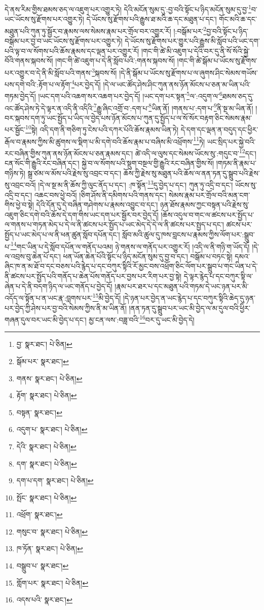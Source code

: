 དེ་ནས་རིམ་གྱིས་ཐམས་ཅད་ལ་འཇུག་པར་འགྱུར་ཏེ། དེའི་མངོན་སུམ་དུ་:བྱ་བའི་སྟོང་པ་ཉིད་མངོན་སུམ་དུ་བྱ་\footnote{བྱ་  སྣར་ཐང་།  པེ་ཅིན། }བ་ཡང་ཡོངས་སུ་རྫོགས་པར་འགྱུར་ཏེ། དེ་ཡོངས་སུ་རྫོགས་པའི་རྒྱུས་ཐ་མའི་ཆ་དང་མཐུན་པ་དང་། གོང་མའི་ཆ་དང་མཐུན་པའི་ཀུན་ཏུ་སྦྱོར་བ་རྣམས་ལས་སེམས་རྣམ་པར་གྲོལ་བར་འགྱུར་རོ། །:བསྒོམ་པར་\footnote{སྒོམ་པར་  སྣར་ཐང་། }བྱ་བའི་སྟོང་པ་ཉིད་བསྒོམ་པར་བྱ་བ་ཡང་ཡོངས་སུ་རྫོགས་པར་འགྱུར་ཏེ། དེ་ཡོངས་སུ་རྫོགས་པར་གྱུར་པའི་རྒྱུས་མི་སློབ་པའི་ཡང་དག་པའི་ལྟ་བ་ལ་སོགས་པའི་ཆོས་རྣམས་དང་ལྡན་པར་འགྱུར་རོ། །གང་གི་ཚེ་མི་འཇུག་པ་དེའི་བར་དུ་ནི་སོ་སོའི་སྐྱེ་བོའི་གནས་སྐབས་སོ། །གང་གི་ཚེ་འཇུག་པ་དེ་ནི་སློབ་པའི་:གནས་སྐབས་སོ། །གང་གི་ཚེ་སྒོམ་པ་ཡོངས་སུ་རྫོགས་པར་འགྱུར་བ་དེ་ནི་མི་སློབ་པའི་གནས་\footnote{གནས་  སྣར་ཐང་།  པེ་ཅིན། }སྐབས་སོ། །དེ་ནི་སྒོམ་པ་ཡོངས་སུ་རྫོགས་པ་ལ་ཞུགས་ཤིང་སེམས་གཡོས་པས་དགེ་བའི་:རྟོག་པ་ལ་རྟོག་\footnote{རྟོག་  སྣར་ཐང་།  པེ་ཅིན། }པར་བྱེད་དོ། །དེ་ལ་ཡང་ཚོད་ཤེས་ཤིང་ཀུན་ནས་ཉོན་མོངས་པ་ཅན་མ་ཡིན་པའི་གཏམ་བྱེད་དོ། །ཡང་དག་པའི་འཆག་སར་འཆག་པར་བྱེད་དོ། །ཡང་དག་པར་སྟན་\footnote{བསྟན་  སྣར་ཐང་། }ལ་:འདུག་ལ་\footnote{འདུག་པ་  སྣར་ཐང་།  པེ་ཅིན། }ཐམས་ཅད་དུ་འང་ཚོད་ཤེས་ཏེ་དེ་ལྟར་ན་འདི་ནི་འདིའི་\footnote{དེའི་  སྣར་ཐང་།  པེ་ཅིན། }རྒྱུ་ཞིང་འགྲོ་བ་:དག་པ་\footnote{དག་  སྣར་ཐང་།  པེ་ཅིན། }ཡིན་ནོ། །གནས་པ་:དག་པ་\footnote{དག་པ་དག་  སྣར་ཐང་།  པེ་ཅིན། }ནི་སྔ་མ་ཡིན་ནོ། །བར་སྐབས་དག་ཏུ་ཡང་སྤྱོད་པ་ཡིད་ལ་བྱེད་པས་ཉོན་མོངས་པ་ཀུན་དུ་སྤྱོད་པ་ལ་སོ་སོར་བརྟག་ཅིང་སེམས་རྣམ་པར་སྦྱོང་\footnote{སྤོང་  སྣར་ཐང་།  པེ་ཅིན། }སྟེ། འདི་དག་ནི་གཅིག་ཏུ་ངེས་པའི་དཀར་པོའི་ཆོས་རྣམས་ཡིན་ཏེ། དེ་དག་དང་ལྡན་ན་བདུད་དང་ཕྱིར་རྒོལ་བ་རྣམས་ཀྱིས་མི་ཚུགས་ལ་སྡིག་པ་མི་དགེ་བའི་ཆོས་རྣམ་པ་བཞིས་མི་འཕྲོགས་\footnote{འཕྲོག་  སྣར་ཐང་། }ཏེ། ཡང་སྲིད་པར་སྐྱེ་བའི་རང་བཞིན་གྱིས་ཀུན་ནས་ཉོན་མོངས་པ་ཅན་རྣམས་དང་། ཚེ་འདི་ལ་ལུས་དང་སེམས་ཡོངས་སུ་:གདུང་བ་\footnote{གསུང་བ་  སྣར་ཐང་།  པེ་ཅིན། }དང་། ངན་སོང་གི་རྒྱུའི་རང་བཞིན་དང་། སྐྱེ་བ་ལ་སོགས་པའི་སྡུག་བསྔལ་གྱི་རྒྱུའི་རང་བཞིན་གྱིས་སོ། །གཏམ་ནི་རྣམ་པ་གཉིས་ཏེ། སྒྲ་ཙམ་ལ་མོས་པའི་རྗེས་སུ་འབྲང་བ་དང་། ཆོས་ཀྱི་རྗེས་སུ་མཐུན་པའི་ཆོས་ལ་ནན་ཏན་དུ་སྒྲུབ་པའི་རྗེས་སུ་འབྲང་བའོ། །དེ་ལ་སྔ་མ་ནི་ཆོས་ཀྱི་ལུང་ནོད་པ་དང་། :ཁ་སྟོན་\footnote{ཁ་ཏོན་  སྣར་ཐང་།  པེ་ཅིན། }དུ་བྱེད་པ་དང་། ཀུན་ཏུ་འདྲི་བ་དང་། ཡོངས་སུ་འདྲི་བ་དང་། འཆང་བས་ཕྱེ་བའོ། །ཅིག་ཤོས་ནི་དམིགས་པའི་གནས་དང་། སེམས་རྣམ་པར་གྲོལ་བའི་མན་ངག་གིས་ཕྱེ་བ་སྟེ། དེའི་དོན་དུ་དེ་བཞིན་གཤེགས་པ་རྣམས་འབྱུང་བ་དང་། ཉན་ཐོས་རྣམས་ཀྱང་བསྟན་པའི་རྗེས་སུ་འཇུག་ཅིང་དགེ་བའི་ཆོས་དེ་དག་གིས་ཡང་དག་པར་སྦྱོར་བར་བྱེད་དོ། །ཆོས་འདུལ་བ་གང་ལ་ཚངས་པར་སྤྱོད་པ་ལ་གནས་པ་གཏན་མེད་པ་དེ་ལ་ནི་ཚངས་པར་སྤྱོད་པ་ཡང་མེད་དེ་དེ་ལ་ནི་ཚངས་པར་སྤྱད་པ་དང་། ཚངས་པར་སྤྱོད་པ་ཡང་མེད་པ་ལ་ནི་ཕན་ཚུན་སློབ་དཔོན་དང་། སློབ་མའི་ཚུལ་དུ་ཁས་བླངས་པ་རྣམས་ཀྱིས་ལོག་པར་:སྒྲུབ་པ་\footnote{བསྒྲུབ་པ་  སྣར་ཐང་། }གང་ཡིན་པ་དེ་སློབ་དཔོན་ལ་གནོད་པའམ། ཉེ་གནས་ལ་གནོད་པར་འགྱུར་རོ། །འདི་ལ་ནི་གཉི་ག་ཡོད་དོ། །དེ་ལ་འབྲས་བུ་ཆེན་པོ་དང་། ཕན་ཡོན་ཆེན་པོའི་སྟོང་པ་ཉིད་མངོན་སུམ་དུ་བྱ་བ་དང་། བསྒོམ་པ་བཏང་སྟེ། དམའ་ཞིང་ཁ་ན་མ་ཐོ་བ་དང་བཅས་པའི་རྙེད་པ་དང་བཀུར་སྟིའི་རོ་མྱང་བས་འཕྲོག་ཅིང་ལོག་པར་སྒྲུབ་པ་གང་ཡིན་པ་དེ་ནི་ཚངས་པར་སྤྱོད་པའི་གནོད་པ་ཆེན་པོས་གནོད་པར་བྱས་པར་རིག་པར་བྱ་སྟེ། དེ་ལྟར་རྙེད་པ་དང་བཀུར་སྟི་ལ་ཞེན་པ་དེ་ནི་བདག་ཉིད་ལ་ཡང་གནོད་པ་བྱེད་དོ། །རྣམ་པར་ཐར་པ་དང་མཐུན་པའི་གཏམ་དེ་ཡང་ཉན་པར་མི་འདོད་ལ་སྟོན་པ་ན་ཡང་རྣ་:བླགས་པར་\footnote{གློག་པར་  སྣར་ཐང་།  པེ་ཅིན། }མི་བྱེད་དོ། །དེ་ཉན་པར་བྱེད་ན་ཡང་རྙེད་པ་དང་བཀུར་སྟིའི་ཆེད་དུ་ཉན་པར་བྱེད་ཀྱི་ཤེས་པར་བྱ་བའི་སེམས་ཀྱིས་ནི་མ་ཡིན་ནོ། །ནན་ཏན་དུ་སྒྲུབ་པར་ཡང་མི་བྱེད་ལ་མ་དུལ་བའི་ཕྱིར་གཞན་དུལ་བར་ཡང་མི་བྱེད་པ་དང་། མྱ་ངན་ལས་:བཟླ་བའི་\footnote{འདས་པའི་  སྣར་ཐང་། }བར་དུ་ཡང་མི་བྱེད་དེ། 